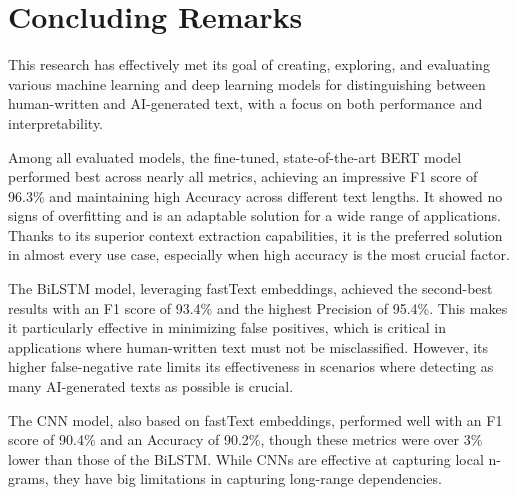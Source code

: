 

\chapter{Concluding Remarks}
\label{08_Concluding_Remarks}
\thispagestyle{empty}


This research has effectively met its goal of creating, exploring, and evaluating various machine learning and deep learning models for distinguishing between human-written and AI-generated text, with a focus on both performance and interpretability.

\vspace{3mm}


Among all evaluated models, the fine-tuned, state-of-the-art BERT model performed best across nearly all metrics, achieving an impressive F1 score of 96.3\% and maintaining high Accuracy across different text lengths. It showed no signs of overfitting and is an adaptable solution for a wide range of applications. Thanks to its superior context extraction capabilities, it is the preferred solution in almost every use case, especially when high accuracy is the most crucial factor.

\vspace{3mm} 

The BiLSTM model, leveraging fastText embeddings, achieved the second-best results with an F1 score of 93.4\% and the highest Precision of 95.4\%. This makes it particularly effective in minimizing false positives, which is critical in applications where human-written text must not be misclassified. However, its higher false-negative rate limits its effectiveness in scenarios where detecting as many AI-generated texts as possible is crucial.

\vspace{3mm} 

The CNN model, also based on fastText embeddings, performed well with an F1 score of 90.4\% and an Accuracy of 90.2\%, though these metrics were over 3\% lower than those of the BiLSTM. While CNNs are effective at capturing local n-grams, they have big limitations in capturing long-range dependencies. 

